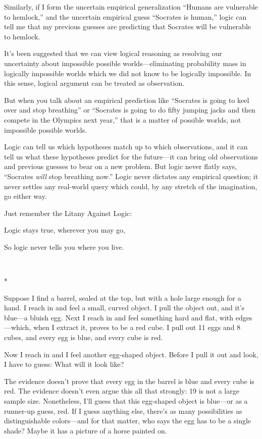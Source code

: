 {
 Similarly, if I form the uncertain empirical generalization
``Humans are vulnerable to
hemlock,'' and the uncertain empirical guess
``Socrates is human,'' logic can
tell me that my previous guesses are predicting that Socrates will be
vulnerable to hemlock.}

{
 It's been suggested that we can view logical
reasoning as resolving our uncertainty about impossible possible
worlds---eliminating probability mass in logically impossible worlds
which we did not know to be logically impossible. In this sense,
logical argument can be treated as observation.}

{
 But when you talk about an empirical prediction like
``Socrates is going to keel over and stop
breathing'' or ``Socrates is going
to do fifty jumping jacks and then compete in the Olympics next
year,'' that is a matter of possible worlds, not
impossible possible worlds.}

{
 Logic can tell us which hypotheses match up to which observations,
and it can tell us what these hypotheses predict for the future---it
can bring old observations and previous guesses to bear on a new
problem. But logic never flatly says, ``Socrates
\textit{will} stop breathing now.'' Logic never
dictates any empirical question; it never settles any real-world query
which could, by any stretch of the imagination, go either way.}

{
 Just remember the Litany Against Logic:}

{
 Logic stays true, wherever you may go,}

{
 So logic never tells you where you live.}

{\centering
 \ ~
\par}

{\centering
 *
\par}


{
 Suppose I find a barrel, sealed at the top, but with a hole large
enough for a hand. I reach in and feel a small, curved object. I pull
the object out, and it's blue---a bluish egg. Next I
reach in and feel something hard and flat, with edges---which, when I
extract it, proves to be a red cube. I pull out 11 eggs and 8 cubes,
and every egg is blue, and every cube is red. }

{
 Now I reach in and I feel another egg-shaped object. Before I pull
it out and look, I have to guess: What will it look like?}

{
 The evidence doesn't prove that every egg in the
barrel is blue and every cube is red. The evidence
doesn't even argue this all that strongly: 19 is not a
large sample size. Nonetheless, I'll guess that this
egg-shaped object is blue---or as a runner-up guess, red. If I guess
anything else, there's as many possibilities as
distinguishable colors---and for that matter, who says the egg has to
be a single shade? Maybe it has a picture of a horse painted on.}


